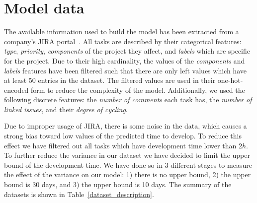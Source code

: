\documentclass[conference,compsoc]{IEEEtran}
\begin{document}


\section{Model data}
The available information used to build the model has been extracted from a company's JIRA portal~\cite{JIRA}. All tasks are described by their categorical features: \textit{type}, \textit{priority}, \textit{components} of the project they affect, and \textit{labels} which are specific for the project. Due to their high cardinality, the values of the \textit{components} and \textit{labels} features have been filtered such that there are only left values which have at least 50 entries in the dataset. The filtered values are used in their one-hot-encoded form to reduce the complexity of the model. Additionally, we used the following discrete features: the \textit{number of comments} each task has, the \textit{number of linked issues}, and their \textit{degree of cycling}.

Due to improper usage of JIRA, there is some noise in the data, which causes a strong bias toward low values of the predicted time to develop. To reduce this effect we have filtered out all tasks which have development time lower than $2h$. To further reduce the variance in our dataset we have decided to limit the upper bound of the development time. We have done so in 3 different stages to measure the effect of the variance on our model: 1) there is no upper bound, 2) the upper bound is 30 days, and 3) the upper bound is 10 days. The summary of the datasets is shown in Table~\ref{dataset_description}.
\end{document}
